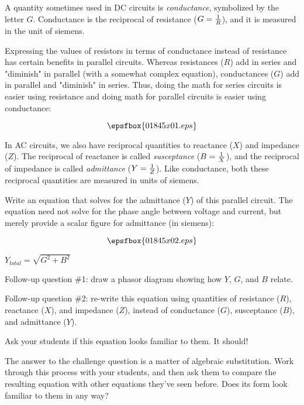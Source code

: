 

A quantity sometimes used in DC circuits is {\it conductance}, symbolized by the letter $G$.  Conductance is the reciprocal of resistance ($G = {1 \over R}$), and it is measured in the unit of siemens.

Expressing the values of resistors in terms of conductance instead of resistance has certain benefits in parallel circuits.  Whereas resistances ($R$) add in series and "diminish" in parallel (with a somewhat complex equation), conductances ($G$) add in parallel and "diminish" in series.  Thus, doing the math for series circuits is easier using resistance and doing math for parallel circuits is easier using conductance:

$$\epsfbox{01845x01.eps}$$

In AC circuits, we also have reciprocal quantities to reactance ($X$) and impedance ($Z$).  The reciprocal of reactance is called {\it susceptance} ($B = {1 \over X}$), and the reciprocal of impedance is called {\it admittance} ($Y = {1 \over Z}$).  Like conductance, both these reciprocal quantities are measured in units of siemens.

Write an equation that solves for the admittance ($Y$) of this parallel circuit.  The equation need not solve for the phase angle between voltage and current, but merely provide a scalar figure for admittance (in siemens):

$$\epsfbox{01845x02.eps}$$







$Y_{total} = \sqrt{G^2 + B^2}$

\vskip 10pt

Follow-up question \#1: draw a phasor diagram showing how $Y$, $G$, and $B$ relate.

\vskip 10pt

Follow-up question \#2: re-write this equation using quantities of resistance ($R$), reactance ($X$), and impedance ($Z$), instead of conductance ($G$), susceptance ($B$), and admittance ($Y$).







Ask your students if this equation looks familiar to them.  It should!

\vskip 10pt

The answer to the challenge question is a matter of algebraic substitution.  Work through this process with your students, and then ask them to compare the resulting equation with other equations they've seen before.  Does its form look familiar to them in any way?




